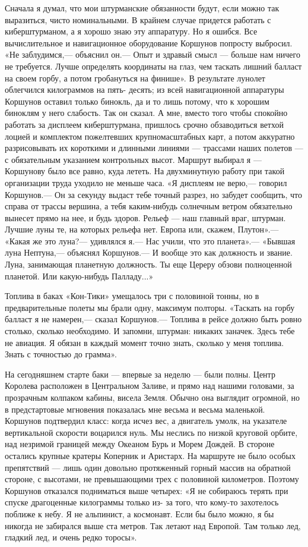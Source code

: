 \documentclass[11pt,a4paper,oneside]{article}
\begin{document}
Сначала я думал, что мои штурманские обязанности будут, если можно так выразиться, чисто номинальными. В крайнем случае придется работать с киберштурманом, а я хорошо знаю эту аппаратуру. Но я ошибся. Все вычислительное и навигационное оборудование Коршунов попросту выбросил. «Не заблудимся,— объяснил он.— Опыт и здравый смысл — больше нам ничего не требуется. Лучше определять координаты на глаз, чем таскать лишний балласт на своем горбу, а потом гробануться на финише». В результате лунолет облегчился килограммов на пять- десять; из всей навигационной аппаратуры Коршунов оставил только бинокль, да и то лишь потому, что к хорошим биноклям у него слабость. Так он сказал. А мне, вместо того чтобы спокойно работать за дисплеем киберштурмана, пришлось срочно обзаводиться ветхой лоцией и комплектом пожелтевших крупномасштабных карт, а потом аккуратно разрисовывать их короткими и длинными линиями — трассами наших полетов — с обязательным указанием контрольных высот. Маршрут выбирал я — Коршунову было все равно, куда лететь. На двухминутную работу при такой организации труда уходило не меньше часа. «Я дисплеям не верю,— говорил Коршунов.— Он за секунду выдаст тебе точный разрез, но забудет сообщить, что справа от трассы вершина, а тебя каким-нибудь солнечным ветром обязательно вынесет прямо на нее, и будь здоров. Рельеф — наш главный враг, штурман. Лучшие луны те, на которых рельефа нет. Европа или, скажем, Плутон».— «Какая же это луна?— удивлялся я.— Нас учили, что это планета».— «Бывшая луна Нептуна,— объяснял Коршунов.— И вообще это как должность и звание. Луна, занимающая планетную должность. Ты еще Цереру обзови полноценной планетой. Или какую-нибудь Палладу...»

Топлива в баках «Кон-Тики» умещалось три с половиной тонны, но в предварительные полеты мы брали одну, максимум полторы. «Таскать на горбу балласт я не намерен,— сказал Коршунов.— Топлива в рейсе должно быть ровно столько, сколько необходимо. И запомни, штурман: никаких заначек. Здесь тебе не авиация. Я обязан в каждый момент точно знать, сколько у меня топлива. Знать с точностью до грамма».

На сегодняшнем старте баки — впервые за неделю — были полны. Центр Королева расположен в Центральном Заливе, и прямо над нашими головами, за прозрачным колпаком кабины, висела Земля. Обычно она выглядит огромной, но в предстартовые мгновения показалась мне весьма и весьма маленькой. Коршунов подтвердил класс: когда исчез вес, а двигатель умолк, на указателе вертикальной скорости воцарился нуль. Мы неслись по низкой круговой орбите, над незримой границей между Океаном Бурь и Морем Дождей. В стороне остались крупные кратеры Коперник и Аристарх. На маршруте не было особых препятствий — лишь один довольно протяженный горный массив на обратной стороне, с высотами, не превышающими трех с половиной километров. Поэтому Коршунов отказался подниматься выше четырех: «Я не собираюсь терять при спуске драгоценные килограммы только из- за того, что кому-то захотелось поближе к небу. Я не альпинист, а космонавт. Если бы было можно, я бы никогда не забирался выше ста метров. Так летают над Европой. Там только лед, гладкий лед, и очень редко торосы».
\end{document}
